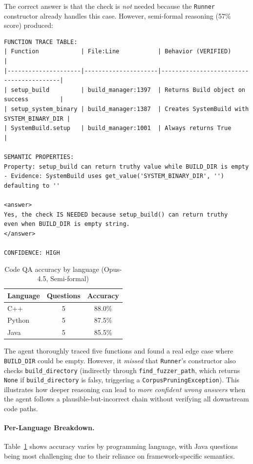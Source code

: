 \documentclass[]{meta}
\begin{document}
The correct answer is that the check is \emph{not} needed because the \texttt{Runner} constructor already handles this case. However, semi-formal reasoning (57\% score) produced:

\begin{tcolorbox}[colback=gray!5, colframe=gray!50, boxrule=0.3pt, breakable]
\small
\begin{verbatim}
FUNCTION TRACE TABLE:
| Function            | File:Line           | Behavior (VERIFIED)                     |
|---------------------|---------------------|-----------------------------------------|
| setup_build         | build_manager:1397  | Returns Build object on success         |
| setup_system_binary | build_manager:1387  | Creates SystemBuild with SYSTEM_BINARY_DIR |
| SystemBuild.setup   | build_manager:1001  | Always returns True                     |

SEMANTIC PROPERTIES:
Property: setup_build can return truthy value while BUILD_DIR is empty
- Evidence: SystemBuild uses get_value('SYSTEM_BINARY_DIR', '') defaulting to ''

<answer>
Yes, the check IS NEEDED because setup_build() can return truthy
even when BUILD_DIR is empty string.
</answer>

CONFIDENCE: HIGH
\end{verbatim}
\end{tcolorbox}

\begin{table}[h]
\centering
\caption{Code QA accuracy by language (Opus-4.5, Semi-formal)}
\label{tab:rubber-duck-lang}
\begin{tabular}{lcc}
\toprule
\textbf{Language} & \textbf{Questions} & \textbf{Accuracy} \\
\midrule
C++ & 5 & 88.0\% \\
Python & 5 & 87.5\% \\
Java & 5 & 85.5\% \\
\bottomrule
\end{tabular}
\end{table}

The agent thoroughly traced five functions and found a real edge case where \texttt{BUILD\_DIR} could be empty. However, it \emph{missed} that \texttt{Runner}'s constructor also checks \texttt{build\_directory} (indirectly through \texttt{find\_fuzzer\_path}, which returns \texttt{None} if \texttt{build\_directory} is falsy, triggering a \texttt{CorpusPruningException}). This illustrates how deeper reasoning can lead to \emph{more confident wrong answers} when the agent follows a plausible-but-incorrect chain without verifying all downstream code paths.

\paragraph{Per-Language Breakdown.}
Table~\ref{tab:rubber-duck-lang} shows accuracy varies by programming language, with Java questions being most challenging due to their reliance on framework-specific semantics.
\end{document}
